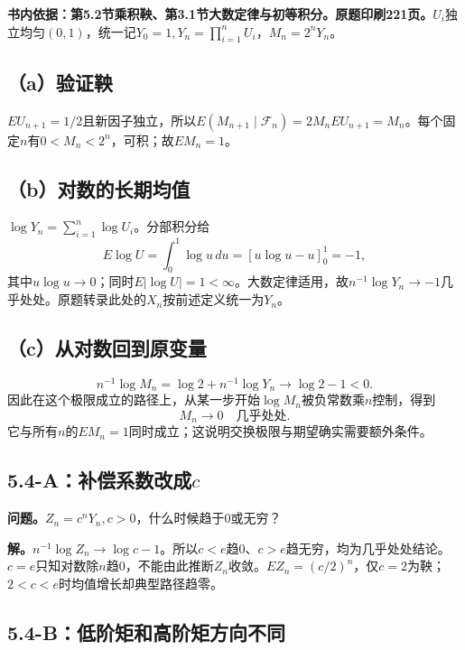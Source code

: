 \documentclass[11pt,a4paper,UTF8,fontset=fandol]{ctexart}
\begin{document}
\textbf{书内依据：第5.2节乘积鞅、第3.1节大数定律与初等积分。原题印刷221页。}\(U_i\)独立均匀\((0,1)\)，统一记\(Y_0=1,Y_n=\prod_{i=1}^nU_i\)，\(M_n=2^nY_n\)。

\subsection{（a）验证鞅}\label{aux9a8cux8bc1ux9785}

\(EU_{n+1}=1/2\)且新因子独立，所以\(E(M_{n+1}\mid\mathcal F_n)=2M_nEU_{n+1}=M_n\)。每个固定\(n\)有\(0<M_n<2^n\)，可积；故\(EM_n=1\)。

\subsection{（b）对数的长期均值}\label{bux5bf9ux6570ux7684ux957fux671fux5747ux503c}

\(\log Y_n=\sum_{i=1}^n\log U_i\)。分部积分给
\[E\log U=\int_0^1\log u\,du=[u\log u-u]_0^1=-1,\]
其中\(u\log u\to0\)；同时\(E|\log U|=1<\infty\)。大数定律适用，故\(\boxed{n^{-1}\log Y_n\to-1}\)几乎处处。原题转录此处的\(X_n\)按前述定义统一为\(Y_n\)。

\subsection{（c）从对数回到原变量}\label{cux4eceux5bf9ux6570ux56deux5230ux539fux53d8ux91cf}

\[n^{-1}\log M_n=\log2+n^{-1}\log Y_n\to\log2-1<0.\]
因此在这个极限成立的路径上，从某一步开始\(\log M_n\)被负常数乘\(n\)控制，得到
\[\boxed{M_n\longrightarrow0\quad\text{几乎处处}.}\]
它与所有\(n\)的\(EM_n=1\)同时成立；这说明交换极限与期望确实需要额外条件。

\subsection{\texorpdfstring{5.4-A：补偿系数改成\(c\)}{5.4-A：补偿系数改成c}}\label{aux8865ux507fux7cfbux6570ux6539ux6210c}

\textbf{问题。}\(Z_n=c^nY_n,c>0\)，什么时候趋于0或无穷？

\textbf{解。}\(n^{-1}\log Z_n\to\log c-1\)。所以\(c<e\)趋0、\(c>e\)趋无穷，均为几乎处处结论。\(c=e\)只知对数除\(n\)趋0，不能由此推断\(Z_n\)收敛。\(EZ_n=(c/2)^n\)，仅\(c=2\)为鞅；\(2<c<e\)时均值增长却典型路径趋零。

\subsection{5.4-B：低阶矩和高阶矩方向不同}\label{bux4f4eux9636ux77e9ux548cux9ad8ux9636ux77e9ux65b9ux5411ux4e0dux540c}
\end{document}
